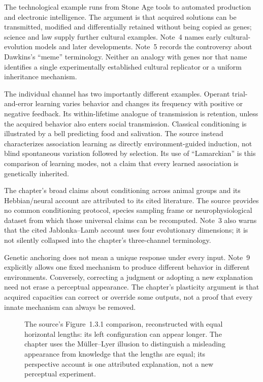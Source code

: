 The technological example runs from Stone Age tools to automated production
and electronic intelligence. The argument is that acquired solutions can
be transmitted, modified and differentially retained without being copied
as genes; science and law supply further cultural examples. Note~4 names
early cultural-evolution models and later developments. Note~5 records the
controversy about Dawkins's ``meme'' terminology. Neither an analogy with
genes nor that name identifies a single experimentally established cultural
replicator or a uniform inheritance mechanism.

The individual channel has two importantly different examples. Operant
trial-and-error learning varies behavior and changes its frequency with
positive or negative feedback. Its within-lifetime analogue of transmission
is retention, unless the acquired behavior also enters social transmission.
Classical conditioning is illustrated by a bell predicting food and
salivation. The source instead characterizes association learning as directly
environment-guided induction, not blind spontaneous variation followed by
selection. Its use of ``Lamarckian'' is this comparison of learning modes,
not a claim that every learned association is genetically inherited.

The chapter's broad claims about conditioning across animal groups and its
Hebbian/neural account are attributed to its cited literature. The source
provides no common conditioning protocol, species sampling frame or
neurophysiological dataset from which those universal claims can be
recomputed. Note~3 also warns that the cited Jablonka--Lamb account uses
four evolutionary dimensions; it is not silently collapsed into the chapter's
three-channel terminology.

Genetic anchoring does not mean a unique response under every input. Note~9
explicitly allows one fixed mechanism to produce different behavior in
different environments. Conversely, correcting a judgment or adopting a
new explanation need not erase a perceptual appearance. The chapter's
plasticity argument is that acquired capacities can correct or override
some outputs, not a proof that every innate mechanism can always be removed.

\begin{figure}[htbp]
\centering
{}
\caption{The source's Figure~1.3.1 comparison, reconstructed with equal
horizontal lengths: its left configuration can appear longer. The chapter
uses the M\"uller--Lyer illusion to distinguish a misleading appearance from
knowledge that the lengths are equal; its perspective account is one
attributed explanation, not a new perceptual experiment.}
\label{fig:p19-r13-muller-lyer}
\end{figure}

